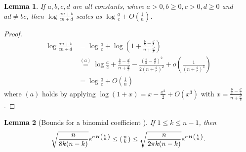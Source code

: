 \documentclass[onecolumn,romanappendices,10pt]{IEEEtran}
\newtheorem{lemma}{Lemma}
\begin{document}
	\begin{lemma} \label{lem:log_frac}
		If $a, b, c, d$ are all constants, where $a > 0, b \geq 0, c > 0, d \geq 0$ and $ad \not= bc$, then $\log \frac{an + b}{cn + d}$ scales as $\log \frac{a}{c} + O\left( \frac{1}{n} \right)$.
	\end{lemma}
	
	\begin{proof}
		\begin{equation}
			\begin{aligned}
				\log \frac{an + b}{cn + d} &= \log \frac{a}{c} + \log \left( 1 + \frac{\frac{b}{a} - \frac{d}{c}}{n + \frac{d}{c}} \right) \\
				&\overset{(a)}{=} \log \frac{a}{c} + \frac{\frac{b}{a} - \frac{d}{c}}{n + \frac{d}{c}} - \frac{(\frac{b}{a} - \frac{d}{c})^2}{2(n + \frac{d}{c})^2} + o\left( \frac{1}{(n + \frac{d}{c})^3} \right) \\
				&= \log \frac{a}{c} + O\left( \frac{1}{n} \right)
			\end{aligned}
		\end{equation}
		where $(a)$ holds by applying $\log (1+x) = x -\frac{x^2}{2} + O(x^3) $ with $x = \frac{\frac{b}{a} - \frac{d}{c}}{n + \frac{d}{c}}$.
	\end{proof}
	
	\begin{lemma}[Bounds for a binomial coefficient {\cite[Lemma~7]{macwilliams1977theory}}] \label{lem:bin_coe_bound}
		If $1 \leq k \leq n - 1$, then
		\begin{equation}
			\begin{aligned}
				\sqrt{\frac{n}{8 k (n - k)}} e^{n H\left( \frac{k}{n} \right)} \leq \begin{psmallmatrix} n \\ k \end{psmallmatrix} \leq \sqrt{\frac{n}{2 \pi k (n - k)}} e^{n H\left( \frac{k}{n} \right)}.
			\end{aligned}
		\end{equation}
	\end{lemma}
	
\end{document}
